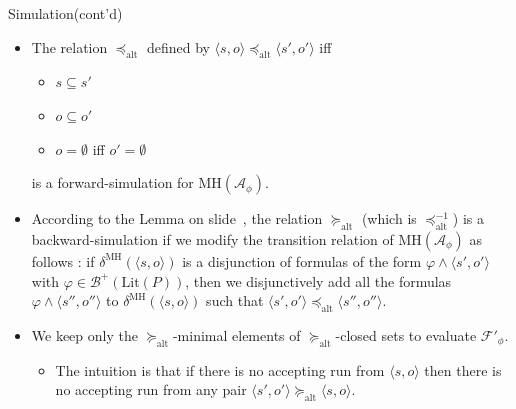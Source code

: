 \documentclass[12pt]{beamer}
\begin{document}
\begin{frame}{Simulation(cont'd)}
	\begin{itemize}
		\item The relation $\preceq_{\text{alt}}$ defined by $\langle s, o \rangle \preceq_{\text{alt}} \langle s', o' \rangle$ iff
		\begin{itemize}
			\item $s \subseteq s'$
			\item $o \subseteq o'$
			\item $o = \emptyset$ iff $o' = \emptyset$
		\end{itemize}
		is a forward-simulation for $\text{MH}(\mathcal{A}_{\phi})$.
		\item According to the Lemma on slide~\pageref{lemma}, the relation $\succeq_{\text{alt}}$ (which is $\preceq_{\text{alt}}^{-1}$) is a backward-simulation if we modify the transition relation of $\text{MH}(\mathcal{A}_{\phi})$ as follows : if $\delta^{\text{MH}}(\langle s, o \rangle)$ is a disjunction of formulas of the form $\varphi \land \langle s', o' \rangle$ with $\varphi \in \mathcal{B}^{+}(\text{Lit}(P))$, then we disjunctively add all the formulas $\varphi \land \langle s'', o'' \rangle$ to $\delta^{\text{MH}}(\langle s, o \rangle)$ such that $\langle s', o' \rangle \preceq_{\text{alt}} \langle s'', o'' \rangle$.
		\item We keep only the $\succeq_{\text{alt}}$-minimal elements of $\succeq_{\text{alt}}$-closed sets to evaluate $\mathcal{F}'_{\phi}$.
		\begin{itemize}
			\item The intuition is that if there is no accepting run from $\langle s, o \rangle$ then there is no accepting run from any pair $\langle s', o' \rangle \succeq_{\text{alt}} \langle s, o \rangle$.
		\end{itemize}
	\end{itemize}
\end{frame}
\end{document}

